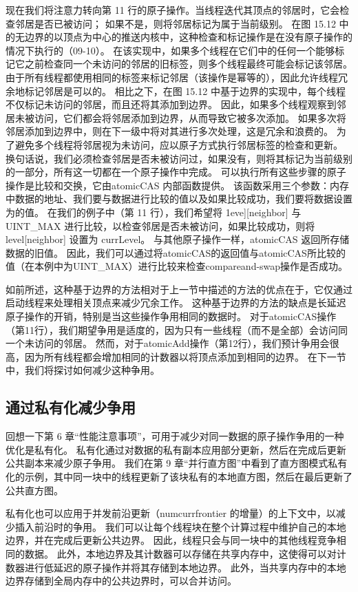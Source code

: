 现在我们将注意力转向第 11 行的原子操作。当线程迭代其顶点的邻居时，它会检查邻居是否已被访问； 如果不是，则将邻居标记为属于当前级别。 在图 15.12 中的无边界的以顶点为中心的推送内核中，这种检查和标记操作是在没有原子操作的情况下执行的（09-10）。 在该实现中，如果多个线程在它们中的任何一个能够标记它之前检查同一个未访问的邻居的旧标签，则多个线程最终可能会标记该邻居。 由于所有线程都使用相同的标签来标记邻居（该操作是幂等的），因此允许线程冗余地标记邻居是可以的。 相比之下，在图 15.12 中基于边界的实现中，每个线程不仅标记未访问的邻居，而且还将其添加到边界。 因此，如果多个线程观察到邻居未被访问，它们都会将邻居添加到边界，从而导致它被多次添加。 如果多次将邻居添加到边界中，则在下一级中将对其进行多次处理，这是冗余和浪费的。 为了避免多个线程将邻居视为未访问，应以原子方式执行邻居标签的检查和更新。 换句话说，我们必须检查邻居是否未被访问过，如果没有，则将其标记为当前级别的一部分，所有这一切都在一个原子操作中完成。 可以执行所有这些步骤的原子操作是比较和交换，它由atomicCAS 内部函数提供。 该函数采用三个参数：内存中数据的地址、我们要与数据进行比较的值以及如果比较成功，我们要将数据设置为的值。 在我们的例子中（第 11 行），我们希望将 1eve][neighbor] 与 UINT\_MAX 进行比较，以检查邻居是否未被访问，如果比较成功，则将 level[neighbor] 设置为 currLevel。 与其他原子操作一样，atomicCAS 返回所存储数据的旧值。 因此，我们可以通过将atomicCAS的返回值与atomicCAS所比较的值（在本例中为UINT\_MAX）进行比较来检查compareand-swap操作是否成功。

如前所述，这种基于边界的方法相对于上一节中描述的方法的优点在于，它仅通过启动线程来处理相关顶点来减少冗余工作。 这种基于边界的方法的缺点是长延迟原子操作的开销，特别是当这些操作争用相同的数据时。 对于atomicCAS操作（第11行），我们期望争用是适度的，因为只有一些线程（而不是全部）会访问同一个未访问的邻居。 然而，对于atomicAdd操作（第12行），我们预计争用会很高，因为所有线程都会增加相同的计数器以将顶点添加到相同的边界。 在下一节中，我们将探讨如何减少这种争用。

\subsection{通过私有化减少争用}
回想一下第 6 章“性能注意事项”，可用于减少对同一数据的原子操作争用的一种优化是私有化。 私有化通过对数据的私有副本应用部分更新，然后在完成后更新公共副本来减少原子争用。 我们在第 9 章“并行直方图”中看到了直方图模式私有化的示例，其中同一块中的线程更新了该块私有的本地直方图，然后在最后更新了公共直方图。

私有化也可以应用于并发前沿更新（numcurrfrontier 的增量）的上下文中，以减少插入前沿时的争用。 我们可以让每个线程块在整个计算过程中维护自己的本地边界，并在完成后更新公共边界。 因此，线程只会与同一块中的其他线程竞争相同的数据。 此外，本地边界及其计数器可以存储在共享内存中，这使得可以对计数器进行低延迟的原子操作并将其存储到本地边界。 此外，当共享内存中的本地边界存储到全局内存中的公共边界时，可以合并访问。

